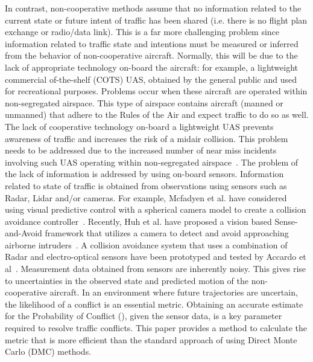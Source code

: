\documentclass[journal]{IEEEtran}
\begin{document}
In contrast, non-cooperative methods assume that no information related to the current state or future intent of traffic has been shared (i.e. there is no flight plan exchange or radio/data link). This is a far more challenging problem since information related to traffic state and intentions must be measured or inferred from the behavior of non-cooperative aircraft. Normally, this will be due to the lack of appropriate technology on-board the aircraft: for example, a lightweight commercial of-the-shelf (COTS) UAS, obtained by the general public and used for recreational purposes. Problems occur when these aircraft are operated within non-segregated airspace. This type of airspace contains aircraft (manned or unmanned) that adhere to the Rules of the Air and expect traffic to do so as well. The lack of cooperative technology on-board a lightweight UAS prevents awareness of traffic and increases the risk of a midair collision. This problem needs to be addressed due to the increased number of near miss incidents involving such UAS operating within non-segregated airspace~\cite{WashpostAug2015NearMiss}. The problem of the lack of information is addressed by using on-board sensors. Information related to state of traffic is obtained from observations using sensors such as Radar, Lidar and/or cameras. For example, Mcfadyen et al. have considered using visual predictive control with a spherical camera model to create a collision avoidance controller~\cite{mcfadyen2013aircraft}. Recently, Huh et al. have proposed a vision based Sense-and-Avoid framework that utilizes a camera to detect and avoid approaching airborne intruders~\cite{HUH2010}. A collision avoidance system that uses a combination of Radar and electro-optical sensors have been prototyped and tested by Accardo et al~\cite{Accardo2013}. Measurement data obtained from sensors are inherently noisy. This gives rise to uncertainties in the observed state and predicted motion of the non-cooperative aircraft. In an environment where future trajectories are uncertain, the likelihood of a conflict is an essential metric. Obtaining an accurate estimate for the Probability of Conflict (), given the sensor data, is a key parameter required to resolve traffic conflicts. This paper provides a method to calculate the  metric that is more efficient than the standard approach of using Direct Monte Carlo (DMC) methods.
\end{document}
